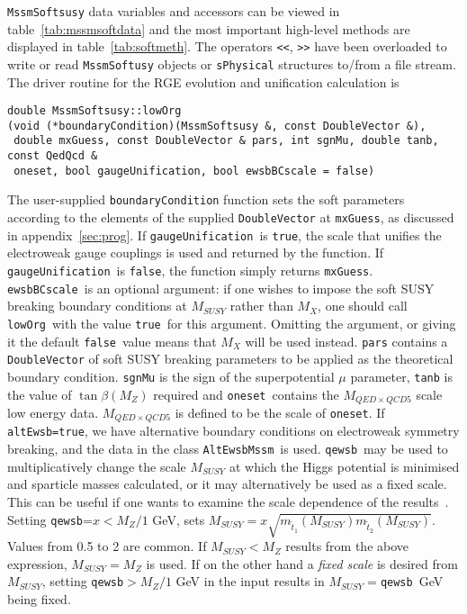 \documentclass{article}
\def\code#1{\small{\tt #1}\normalsize}
\begin{document}
\code{MssmSoftsusy} data variables and accessors can be viewed in
table~\ref{tab:mssmsoftdata} and the most important high-level 
methods are displayed in table~\ref{tab:softmeth}.
The operators \code{<<}, \code{>>} have been overloaded to write or read 
\code{MssmSoftusy} objects or \code{sPhysical} structures to/from a file
stream. 
The driver routine for the RGE evolution and unification calculation is
\small
\begin{verbatim}
double MssmSoftsusy::lowOrg
(void (*boundaryCondition)(MssmSoftsusy &, const DoubleVector &),
 double mxGuess, const DoubleVector & pars, int sgnMu, double tanb, const QedQcd &
 oneset, bool gaugeUnification, bool ewsbBCscale = false)
\end{verbatim}
\normalsize
The user-supplied \code{boundaryCondition} function sets the soft parameters 
according to 
the elements of the supplied \code{DoubleVector} at \code{mxGuess}, 
as discussed in appendix~\ref{sec:prog}. If \code{gaugeUnification}~is
\code{true}, the scale that unifies the electroweak gauge couplings is used
and returned by the function. If \code{gaugeUnification}~is \code{false}, the
function simply returns \code{mxGuess}.
\code{ewsbBCscale}~is an optional argument: if one wishes to impose the soft
SUSY breaking boundary conditions at $M_{SUSY}$ rather than $M_X$, one should
call \code{lowOrg}~with the value \code{true}~for this argument. Omitting the
argument, or giving it the default \code{false}~value means that $M_X$ will be
used instead. 
\code{pars} contains a \code{DoubleVector}
of soft SUSY breaking parameters to be applied as the theoretical boundary
condition.  
\code{sgnMu} is the sign of the
superpotential $\mu$ parameter, \code{tanb} is the value of $\tan \beta (M_Z)$
required and \code{oneset}~contains the $M_{QED \times QCD5}$ scale low energy
data. $M_{QED \times QCD5}$ is defined to be the scale of \code{oneset}.
If \code{altEwsb=true}, we have alternative boundary conditions on electroweak
symmetry breaking, and the data in the class \code{AltEwsbMssm}~is used.
\code{qewsb}~may be used to multiplicatively change the scale $M_{SUSY}$ at which 
the Higgs potential is minimised and sparticle masses calculated, or it may
alternatively be used as a fixed scale.
This can be useful if one wants to examine
the scale dependence of the results~\cite{scaledep}. Setting
\code{qewsb}=$x<M_Z/1$ GeV,
sets $M_{SUSY} = x\sqrt{m_{\tilde t_1}(M_{SUSY}) m_{\tilde t_2}(M_{SUSY})}$. Values from
0.5 to 2 are common. If $M_{SUSY}<M_Z$ results from the above expression, $M_{SUSY}=M_Z$
is used. If on the other hand a {\em fixed scale}\/ is desired from $M_{SUSY}$, 
setting \code{qewsb}$>M_Z/1$ GeV in the input results in 
$M_{SUSY}=$\code{qewsb}~GeV being fixed.
\end{document}
